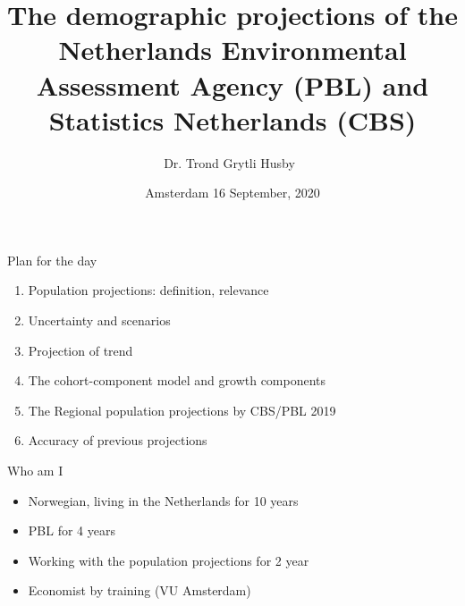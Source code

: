 \documentclass[final, 12pt, aspectratio=169, xcolor={dvipsnames}]{beamer}
\title[PEARL]{The demographic projections of the Netherlands Environmental Assessment Agency (PBL) and Statistics Netherlands (CBS)}
\subtitle[PEARL]{}
\author[T. Husby]{Dr. Trond Grytli Husby\ }
\institute[PBL]{
  Netherlands Environmental Assesment Agency (PBL) \\[5ex]
  \texttt{trond.husby@pbl.nl}
}
\date[\today]{Amsterdam 16 September, 2020}
\begin{document}
\beamertemplatenavigationsymbolsempty

{

  \begin{frame}
    \titlepage
  \end{frame}
}



\begin{frame}{Plan for the day}  
  \begin{enumerate}
  \item Population projections: definition, relevance
  \item Uncertainty and scenarios
  \item Projection of trend
  \item The cohort-component model and growth components
  \item The Regional population projections by CBS/PBL 2019 \href{https://themasites.pbl.nl/regionale-bevolkingsprognose/}{}
  \item Accuracy of previous projections
    \end{enumerate}
\end{frame}


\begin{frame}{Who am I}
  \begin{itemize}
  \item Norwegian, living in the Netherlands for 10 years 
  \item PBL for 4 years
  \item Working with the population projections for 2 year
    \item Economist by training (VU Amsterdam)
    \end{itemize}
\end{frame}

\end{document}
